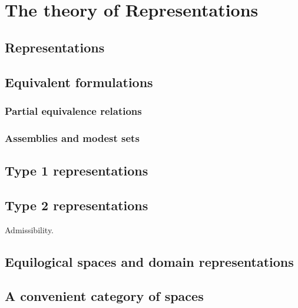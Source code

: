 \chapter{The theory of Representations}
\label{chap:representations}

\section{Representations}
\label{sec:representations}

\section{Equivalent formulations}
\label{sec:representations-formulations}

\subsection{Partial equivalence relations}
\label{sec:pers}

\subsection{Assemblies and modest sets}
\label{sec:assemblies}

\section{Type 1 representations}
\label{sec:type-1-representations}

\section{Type 2 representations}
\label{sec:tte-representations}

Admissibility.

\section{Equilogical spaces and domain representations}
\label{sec:equilogical-spaces}

\section{A convenient category of spaces}
\label{sec:qcb-spaces}



